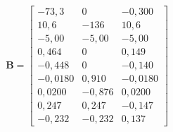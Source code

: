 \begin{equation}
  \label{eq:matriz_B}
  \mathbf{B} = \begin{bmatrix}
-73{,}3 & 0 & -0{,}300 \\
10{,}6 & -136 & 10{,}6 \\
-5{,}00 & -5{,}00 & -5{,}00 \\
0{,}464 & 0 & 0{,}149 \\
-0{,}448 & 0 & -0{,}140 \\
-0{,}0180 & 0{,}910 & -0{,}0180 \\
0{,}0200 & -0{,}876 & 0{,}0200 \\
0{,}247 & 0{,}247 & -0{,}147 \\
-0{,}232 & -0{,}232 & 0{,}137
\end{bmatrix}
\end{equation}
